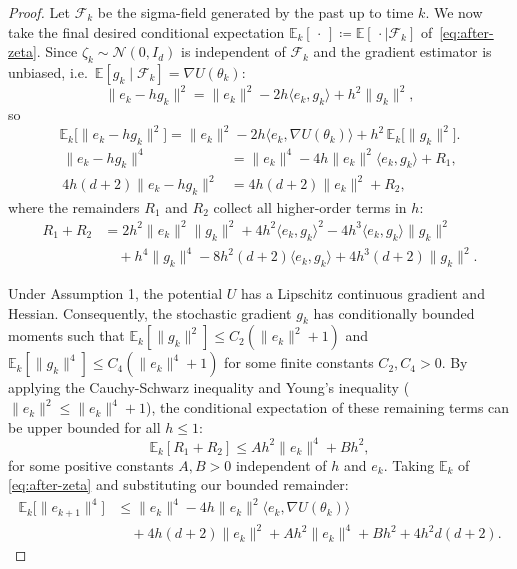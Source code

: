 \begin{proof}
Let $\mathcal{F}_k$ be the sigma-field generated by the past up to time $k$.
We now take the final desired conditional expectation $\mathbb{E}_k[\,\cdot\,] \coloneqq
\mathbb{E}[\,\cdot \mid \mathcal{F}_k]$ of~\eqref{eq:after-zeta}.
Since $\zeta_k \sim \mathcal{N}(0, I_d)$ is independent of $\mathcal{F}_k$ and
the gradient estimator is unbiased, i.e.\
$\mathbb{E}[g_k \mid \mathcal{F}_k] = \nabla U(\theta_k)$:
\begin{equation}
  \|e_k - hg_k\|^2
  = \|e_k\|^2 - 2h\langle e_k, g_k \rangle + h^2\|g_k\|^2,
\end{equation}
so
\[
  \mathbb{E}_k\bigl[\|e_k - hg_k\|^2\bigr]
  = \|e_k\|^2
    - 2h\langle e_k, \nabla U(\theta_k) \rangle
    + h^2\,\mathbb{E}_k\bigl[\|g_k\|^2\bigr].
\]
\begin{align}
    \|e_k - hg_k\|^4 &= \|e_k\|^4 - 4h\|e_k\|^2\langle e_k, g_k \rangle + R_1, \\
    4h(d+2)\|e_k - hg_k\|^2 &= 4h(d+2)\|e_k\|^2 + R_2,
\end{align}
where the remainders $R_1$ and $R_2$ collect all higher-order terms in $h$:
\begin{align*}
    R_1 + R_2 &= 2h^2\|e_k\|^2\|g_k\|^2 + 4h^2\langle e_k, g_k \rangle^2 - 4h^3\langle e_k, g_k \rangle\|g_k\|^2 \\
    &\quad + h^4\|g_k\|^4 - 8h^2(d+2)\langle e_k, g_k \rangle + 4h^3(d+2)\|g_k\|^2.
\end{align*}

Under Assumption 1, the potential $U$ has a Lipschitz continuous gradient and Hessian. Consequently, the stochastic gradient $g_k$ has conditionally bounded moments such that $\mathbb{E}_k[\|g_k\|^2] \leq C_2(\|e_k\|^2 + 1)$ and $\mathbb{E}_k[\|g_k\|^4] \leq C_4(\|e_k\|^4 + 1)$ for some finite constants $C_2, C_4 > 0$. By applying the Cauchy-Schwarz inequality and Young's inequality ($\|e_k\|^2 \leq \|e_k\|^4 + 1$), the conditional expectation of these remaining terms can be upper bounded for all $h \leq 1$:
\begin{equation}
    \mathbb{E}_k[R_1 + R_2] \leq A h^2 \|e_k\|^4 + B h^2,
\end{equation}
for some positive constants $A, B > 0$ independent of $h$ and $e_k$. Taking $\mathbb{E}_k$ of \eqref{eq:after-zeta} and substituting our bounded remainder:
\begin{equation}\label{eq:drift_leading}
\begin{aligned}
    \mathbb{E}_k\big[\|e_{k+1}\|^4\big] &\leq \|e_k\|^4 - 4h\|e_k\|^2\langle e_k, \nabla U(\theta_k) \rangle \\
&\quad + 4h(d+2)\|e_k\|^2 + Ah^2\|e_k\|^4 + Bh^2 + 4h^2d(d+2).
\end{aligned}
\end{equation}


\end{proof}
